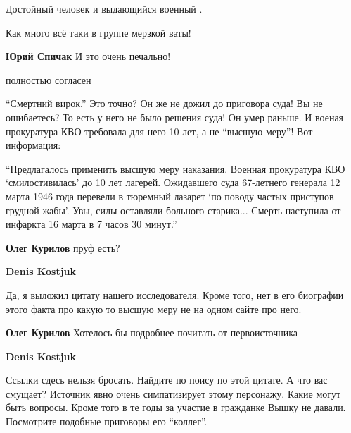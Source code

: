 \begin{itemize}
Достойный человек и выдающийся военный .

Как много всё таки в группе мерзкой ваты!

\begin{itemize} %
\textbf{Юрий Спичак} И это очень печально!

полностью согласен
\end{itemize} %


\enquote{Смертний вирок.} Это точно? Он же не дожил до приговора суда! Вы не
ошибаетесь? То есть у него не было решения суда! Он умер раньше. И военая
прокуратура КВО требовала для него 10 лет, а не \enquote{высшую меру}! Вот информация:

\enquote{Предлагалось применить высшую меру наказания. Военная прокуратура КВО
\enquote{смилостивилась} до 10 лет лагерей.
Ожидавшего суда 67-летнего генерала 12 марта 1946 года перевели в тюремный
лазарет \enquote{по поводу частых приступов грудной жабы}. Увы, силы оставляли больного
старика... Смерть наступила от инфаркта 16 марта в 7 часов 30 минут.}

\begin{itemize} %
\textbf{Олег Курилов} пруф есть?

\begin{itemize} %
\textbf{Denis Kostjuk} 

Да, я выложил цитату нашего исследователя. Кроме того, нет в его биографии
этого факта про какую то высшую меру не на одном сайте про него.

\textbf{Олег Курилов} Хотелось бы подробнее почитать от первоисточника

\textbf{Denis Kostjuk} 

Ссылки сдесь нельзя бросать. Найдите по поису по этой цитате. А что вас
смущает? Источник явно очень симпатизирует этому персонажу. Какие могут быть
вопросы. Кроме того в те годы за участие в гражданке Вышку не давали.
Посмотрите подобные приговоры его \enquote{коллег}.


\end{itemize}
\end{itemize}
\end{itemize}

